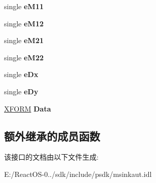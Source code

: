 \begin{DoxyCompactItemize}
\item 
\mbox{\label{interface_m_s_i_n_k_a_u_t_lib_1_1_i_ink_transform_ab49d2b3764b9241d8380a95733765afe}} 
single {\bfseries e\+M11}
\item 
\mbox{\label{interface_m_s_i_n_k_a_u_t_lib_1_1_i_ink_transform_a1ea2b171d767f3ab47ec9fd850666d8c}} 
single {\bfseries e\+M12}
\item 
\mbox{\label{interface_m_s_i_n_k_a_u_t_lib_1_1_i_ink_transform_aa28cec19e249cbe7fcfd52fc6e10e8fd}} 
single {\bfseries e\+M21}
\item 
\mbox{\label{interface_m_s_i_n_k_a_u_t_lib_1_1_i_ink_transform_abd958ea58a7ebe04c6d17d146cb98a42}} 
single {\bfseries e\+M22}
\item 
\mbox{\label{interface_m_s_i_n_k_a_u_t_lib_1_1_i_ink_transform_a4b3d16b56bd833b193688cae5120d80a}} 
single {\bfseries e\+Dx}
\item 
\mbox{\label{interface_m_s_i_n_k_a_u_t_lib_1_1_i_ink_transform_abd26b5238ee7fb6f78faa4dd650682f4}} 
single {\bfseries e\+Dy}
\item 
\mbox{\label{interface_m_s_i_n_k_a_u_t_lib_1_1_i_ink_transform_afc69c874595d28d0cae52ed753eb5d4f}} 
\hyperlink{struct_m_s_i_n_k_a_u_t_lib_1_1tag_x_f_o_r_m}{X\+F\+O\+RM} {\bfseries Data}
\end{DoxyCompactItemize}
\subsection*{额外继承的成员函数}


该接口的文档由以下文件生成\+:\begin{DoxyCompactItemize}
\item 
E\+:/\+React\+O\+S-\/0../sdk/include/psdk/msinkaut.\+idl\end{DoxyCompactItemize}
